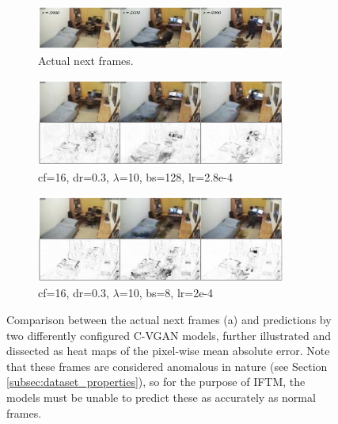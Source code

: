 \begin{figure}
  \centering

	\begin{subfigure}{\textwidth}
		\centering
		\includegraphics[width=0.9\textwidth]{graphics/eval/cvgan_2/qual_prediction/real/anomalous.pdf}
	  \caption{Actual next frames.}
	  \label{subfig:cvgan_prediction_anomalous}
	\end{subfigure}
	
  \begin{subfigure}{\textwidth}
	  \centering
		\includegraphics[width=0.9\textwidth]{graphics/eval/cvgan_2/qual_prediction/cvgan_2_dfilter-16_ddropout-0.3_lambda-10_batchsize-128_learningrate-0.000282842712474619_epochs-0050/anomalous.pdf}
		\caption{cf=16, dr=0.3, $\lambda$=10, bs=128, lr=2.8e-4}
		\label{subfig:bs128-pred-a}
	\end{subfigure}	
	
	\begin{subfigure}{\textwidth}
	  \centering
		\includegraphics[width=0.9\textwidth]{graphics/eval/cvgan_2/qual_prediction/cvgan_2_dfilter-16_ddropout-0.3_lambda-10_batchsize-8_learningrate-0.0002_epochs-0050/anomalous.pdf}
		\caption{cf=16, dr=0.3, $\lambda$=10, bs=8, lr=2e-4}
		\label{subfig:bs8-pred-a}
	\end{subfigure}
	
	\caption[Prediction error heat maps for anomalous frames predicted by C-VGANs.]{Comparison between the actual next frames (a) and predictions by two differently configured C-VGAN models, further illustrated and dissected as heat maps of the pixel-wise mean absolute error. Note that these frames are considered anomalous in nature (see Section \ref{subsec:dataset_properties}), so for the purpose of IFTM, the models must be unable to predict these as accurately as normal frames.}
		\label{fig:cvgan_prediction_anomalous}
\end{figure}

